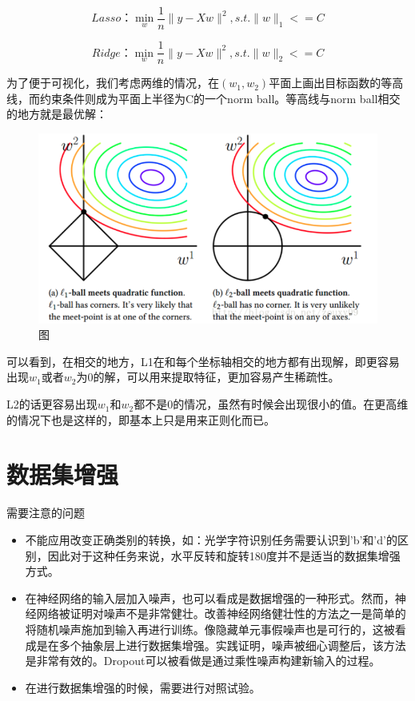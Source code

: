 	\begin{equation}
		Lasso：\min_{w} \frac{1}{n} \|y-Xw\|^2,s.t.\|w\|_1<=C
	\end{equation}
	
	\begin{equation}
		Ridge：\min_{w} \frac{1}{n} \|y-Xw\|^2,s.t.\|w\|_2<=C
	\end{equation}
	
	为了便于可视化，我们考虑两维的情况，在$(w_1,w_2)$平面上画出目标函数的等高线，而约束条件则成为平面上半径为C的一个norm ball。等高线与norm ball相交的地方就是最优解：
	
	\begin{figure}[htbp]
	\centering\includegraphics[width=6in]{img/3-2.png}
	\caption{图}\label{fig:3-2}
	\end{figure}
	
	可以看到，在相交的地方，L1在和每个坐标轴相交的地方都有出现解，即更容易出现$w_1$或者$w_2$为0的解，可以用来提取特征，更加容易产生稀疏性。
	
	L2的话更容易出现$w_1$和$w_2$都不是0的情况，虽然有时候会出现很小的值。在更高维的情况下也是这样的，即基本上只是用来正则化而已。
	



\section{数据集增强}

	需要注意的问题
	\begin{itemize}
		\item 不能应用改变正确类别的转换，如：光学字符识别任务需要认识到'b'和'd'的区别，因此对于这种任务来说，水平反转和旋转180度并不是适当的数据集增强方式。
		\item 在神经网络的输入层加入噪声，也可以看成是数据增强的一种形式。然而，神经网络被证明对噪声不是非常健壮。改善神经网络健壮性的方法之一是简单的将随机噪声施加到输入再进行训练。像隐藏单元事假噪声也是可行的，这被看成是在多个抽象层上进行数据集增强。实践证明，噪声被细心调整后，该方法是非常有效的。Dropout可以被看做是通过乘性噪声构建新输入的过程。
		\item 在进行数据集增强的时候，需要进行对照试验。
		
	\end{itemize}
	

